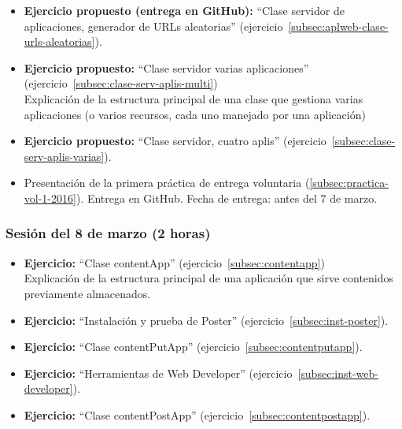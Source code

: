 \documentclass[a4paper,12pt]{article}
\begin{document}
\begin{itemize}

\item \textbf{Ejercicio propuesto (entrega en GitHub):} ``Clase servidor de aplicaciones, generador de URLs aleatorias'' (ejercicio~\ref{subsec:aplweb-clase-urls-aleatorias}).
\item \textbf{Ejercicio propuesto:}  ``Clase servidor varias aplicaciones'' (ejercicio~\ref{subsec:clase-serv-aplis-multi}) \\
  Explicación de la estructura principal de una clase que gestiona varias aplicaciones (o varios recursos, cada uno manejado por una aplicación)
\item \textbf{Ejercicio propuesto:} ``Clase servidor, cuatro aplis'' (ejercicio~\ref{subsec:clase-serv-aplis-varias}).
  \item Presentación de la primera práctica de entrega voluntaria (\ref{subsec:practica-vol-1-2016}). Entrega en GitHub. Fecha de entrega: antes del 7 de marzo.
\end{itemize}

\subsubsection{Sesión del 8 de marzo (2 horas)}


\begin{itemize}

 \item \textbf{Ejercicio:}  ``Clase contentApp'' (ejercicio~\ref{subsec:contentapp}) \\
   Explicación de la estructura principal de una aplicación que sirve contenidos previamente almacenados.
    \item \textbf{Ejercicio:} ``Instalación y prueba de Poster'' (ejercicio~\ref{subsec:inst-poster}).
 \item \textbf{Ejercicio:} ``Clase contentPutApp'' (ejercicio~\ref{subsec:contentputapp}).
  \item \textbf{Ejercicio:} ``Herramientas de Web Developer'' (ejercicio~\ref{subsec:inst-web-developer}).
 \item \textbf{Ejercicio:} ``Clase contentPostApp'' (ejercicio~\ref{subsec:contentpostapp}).

\end{itemize}



\end{document}

